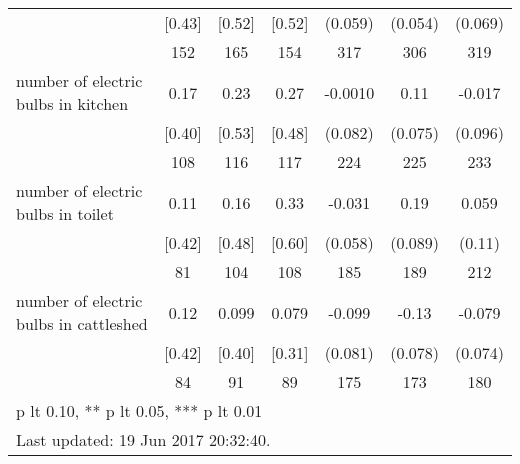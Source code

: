 \begin{table}[htbp]
\begin{tabular*}{1\hsize}{@{\hskip\tabcolsep\extracolsep\fill}l*{1}{cccccc}}
                                &   [0.43]&   [0.52]&   [0.52]&  (0.059)         &  (0.054)         &  (0.069)         \\
                                &      152&      165&      154&      317         &      306         &      319         \\
number of electric bulbs in kitchen&     0.17&     0.23&     0.27&  -0.0010         &     0.11         &   -0.017         \\
                                &   [0.40]&   [0.53]&   [0.48]&  (0.082)         &  (0.075)         &  (0.096)         \\
                                &      108&      116&      117&      224         &      225         &      233         \\
number of electric bulbs in toilet&     0.11&     0.16&     0.33&   -0.031         &     0.19\sym{**} &    0.059         \\
                                &   [0.42]&   [0.48]&   [0.60]&  (0.058)         &  (0.089)         &   (0.11)         \\
                                &       81&      104&      108&      185         &      189         &      212         \\
number of electric bulbs in cattleshed&     0.12&    0.099&    0.079&   -0.099         &    -0.13\sym{*}  &   -0.079         \\
                                &   [0.42]&   [0.40]&   [0.31]&  (0.081)         &  (0.078)         &  (0.074)         \\
                                &       84&       91&       89&      175         &      173         &      180         \\
\bottomrule
\multicolumn{7}{l}{\footnotesize * p lt 0.10, ** p lt 0.05, *** p lt 0.01}\\
\multicolumn{7}{l}{\footnotesize Last updated: 19 Jun 2017 20:32:40.}\\
\end{tabular*}
\end{table}
